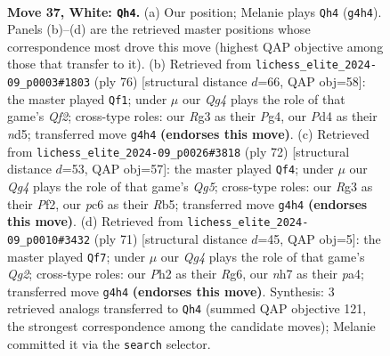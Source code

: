 \documentclass[11pt]{article}
\begin{document}
\clearpage

\begin{figure}[p]\centering
\begin{subfigure}{0.46\textwidth}\centering
\resizebox{\linewidth}{!}{%
\newchessgame
\chessboard[
  setfen={7k/p2p3n/2p2p1q/8/1P1P2Q1/6RK/5P1P/6r1 w - - 6 37},
  showmover=false,
  pgfstyle=straightmove, color=movearrow, markmove={g4-h4}
]}
\caption{}
\end{subfigure}\hfill
\begin{subfigure}{0.46\textwidth}\centering
\resizebox{\linewidth}{!}{%
\newchessgame
\chessboard[
  setfen={5r2/R2R1pk1/1p6/3n2p1/3p2P1/5P2/P4Q2/2q3K1 w - - 3 39},
  showmover=false,
  pgfstyle=straightmove, color=movearrow, markmove={f2-f1}
]}
\caption{}
\end{subfigure}
\\[4pt]
\begin{subfigure}{0.46\textwidth}\centering
\resizebox{\linewidth}{!}{%
\newchessgame
\chessboard[
  setfen={6k1/p4pp1/1p6/1R4Q1/P3q1K1/6P1/5P2/7r w - - 5 37},
  showmover=false,
  pgfstyle=straightmove, color=movearrow, markmove={g5-f4}
]}
\caption{}
\end{subfigure}\hfill
\begin{subfigure}{0.46\textwidth}\centering
\resizebox{\linewidth}{!}{%
\newchessgame
\chessboard[
  setfen={4r1k1/6qp/1R4r1/p2p3Q/P4P2/4P3/4NK1P/8 b - - 0 36},
  showmover=false,
  pgfstyle=straightmove, color=movearrow, markmove={g7-f7}
]}
\caption{}
\end{subfigure}
\caption{\textbf{Move 37, White: \texttt{Qh4}.} (a) Our position; Melanie plays \texttt{Qh4} (\texttt{g4h4}). Panels (b)--(d) are the retrieved master positions whose correspondence most drove this move (highest QAP objective among those that transfer to it). (b) Retrieved from \texttt{lichess\_elite\_2024-09\_p0003\#1803} (ply 76) [structural distance $d$=66, QAP obj=58]: the master played \texttt{Qf1}; under $\mu$ our \emph{Qg4} plays the role of that game's \emph{Qf2}; cross-type roles: our \emph{R}g3 as their \emph{P}g4, our \emph{P}d4 as their \emph{n}d5; transferred move \texttt{g4h4} \textbf{(endorses this move)}. (c) Retrieved from \texttt{lichess\_elite\_2024-09\_p0026\#3818} (ply 72) [structural distance $d$=53, QAP obj=57]: the master played \texttt{Qf4}; under $\mu$ our \emph{Qg4} plays the role of that game's \emph{Qg5}; cross-type roles: our \emph{R}g3 as their \emph{P}f2, our \emph{p}c6 as their \emph{R}b5; transferred move \texttt{g4h4} \textbf{(endorses this move)}. (d) Retrieved from \texttt{lichess\_elite\_2024-09\_p0010\#3432} (ply 71) [structural distance $d$=45, QAP obj=5]: the master played \texttt{Qf7}; under $\mu$ our \emph{Qg4} plays the role of that game's \emph{Qg2}; cross-type roles: our \emph{P}h2 as their \emph{R}g6, our \emph{n}h7 as their \emph{p}a4; transferred move \texttt{g4h4} \textbf{(endorses this move)}. Synthesis: 3 retrieved analogs transferred to \texttt{Qh4} (summed QAP objective 121, the strongest correspondence among the candidate moves); Melanie committed it via the \texttt{search} selector.}
\label{fig:thought-m72}
\end{figure}
\end{document}
